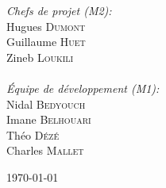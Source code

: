 \begin{titlepage}
\begin{center}
\begin{minipage}{0.4\textwidth}
\begin{flushleft}
    \end{flushleft}
    \end{minipage}
    \begin{minipage}{0.4\textwidth}
    \begin{flushright} \large
    
	\emph{Chefs de projet (M2):}\\
    Hugues \textsc{Dumont}\\
    Guillaume \textsc{Huet}\\
    Zineb \textsc{Loukili}\\
    \textsc{\Large }\\[0.3cm]
    \emph{Équipe de développement (M1):}\\
    Nidal \textsc{Bedyouch}\\
    Imane \textsc{Belhouari}\\
    Théo \textsc{Dézé}\\
    Charles \textsc{Mallet}    
    \end{flushright}
    \end{minipage}
    
    \vfill
    
    {\large \today}
    
    \end{center}
    \end{titlepage}